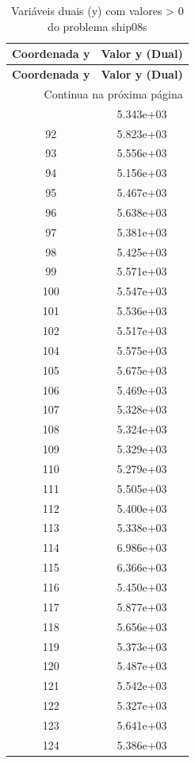 \documentclass[12pt]{article}
\begin{document}
\begin{longtable}{@{}cc@{}}
\caption{Variáveis duais (y) com valores > 0 do problema ship08s} \\
\toprule
\textbf{Coordenada y} & \textbf{Valor y (Dual)} \\
\midrule
\endfirsthead

\toprule
\textbf{Coordenada y} & \textbf{Valor y (Dual)} \\
\midrule
\endhead

\midrule \multicolumn{2}{r}{{Continua na próxima página}} \\ \midrule
\endfoot

\bottomrule
\endlastfoot
91 & 5.343e+03 \\
92 & 5.823e+03 \\
93 & 5.556e+03 \\
94 & 5.156e+03 \\
95 & 5.467e+03 \\
96 & 5.638e+03 \\
97 & 5.381e+03 \\
98 & 5.425e+03 \\
99 & 5.571e+03 \\
100 & 5.547e+03 \\
101 & 5.536e+03 \\
102 & 5.517e+03 \\
104 & 5.575e+03 \\
105 & 5.675e+03 \\
106 & 5.469e+03 \\
107 & 5.328e+03 \\
108 & 5.324e+03 \\
109 & 5.329e+03 \\
110 & 5.279e+03 \\
111 & 5.505e+03 \\
112 & 5.400e+03 \\
113 & 5.338e+03 \\
114 & 6.986e+03 \\
115 & 6.366e+03 \\
116 & 5.450e+03 \\
117 & 5.877e+03 \\
118 & 5.656e+03 \\
119 & 5.373e+03 \\
120 & 5.487e+03 \\
121 & 5.542e+03 \\
122 & 5.327e+03 \\
123 & 5.641e+03 \\
124 & 5.386e+03 \\

\end{longtable}
\end{document}

